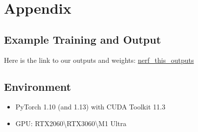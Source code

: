 


{\small


}


\section*{Appendix}
\subsection*{Example Training and Output}


Here is the link to our outputs and weights: \href{https://drive.google.com/drive/folders/19VngwjdyA_Q5l2s-D8mha2ZMw6w8XV_c?usp=share_link}{nerf\_this\_outputs} 



\subsection*{Environment}
\begin{itemize}
    \item PyTorch 1.10 (and 1.13) with CUDA Toolkit 11.3
    \item GPU: RTX2060\textbackslash RTX3060\textbackslash M1 Ultra
\end{itemize}

